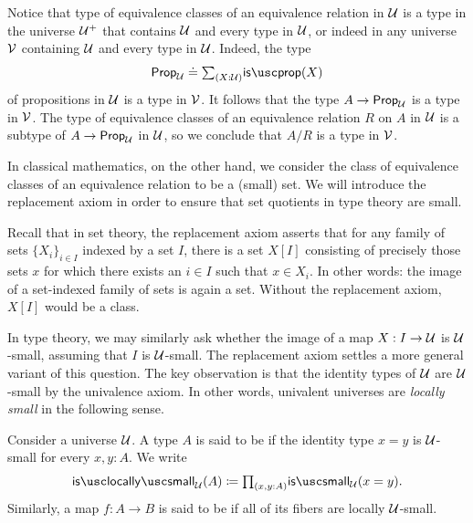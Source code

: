 \begin{rmk}
  Notice that type of equivalence classes of an equivalence relation in $\mathcal{U}$ is a type in the universe $\mathcal{U}^+$ that contains $\mathcal{U}$ and every type in $\mathcal{U}$, or indeed in any universe $\mathcal{V}$ containing $\mathcal{U}$ and every type in $\mathcal{U}$. Indeed, the type
  \begin{equation*}
    \prop_\UU\jdeq\sm{X:\UU}\isprop(X)
  \end{equation*}
  of propositions in $\mathcal{U}$ is a type in $\mathcal{V}$. It follows that the type $A\to\mathsf{Prop}_{\mathcal{U}}$ is a type in $\mathcal{V}$. The type of equivalence classes of an equivalence relation $R$ on $A$ in $\mathcal{U}$ is a subtype of $A\to\mathsf{Prop}_{\mathcal{U}}$ in $\mathcal{U}$, so we conclude that $A/R$ is a type in $\mathcal{V}$.
\end{rmk}

In classical mathematics, on the other hand, we consider the class of equivalence classes of an equivalence relation to be a (small) set. We will introduce the replacement axiom in order to ensure that set quotients in type theory are small.

Recall that in set theory, the replacement axiom asserts that for any family of sets $\{X_i\}_{i\in I}$ indexed by a set $I$, there is a set $X[I]$ consisting of precisely those sets $x$ for which there exists an $i\in I$ such that $x\in X_i$. In other words: the image of a set-indexed family of sets is again a set. Without the replacement axiom, $X[I]$ would be a class.

In type theory, we may similarly ask whether the image of a map $X:I\to\mathcal{U}$ is $\mathcal{U}$-small, assuming that $I$ is $\mathcal{U}$-small. The replacement axiom settles a more general variant of this question. The key observation is that the identity types of $\mathcal{U}$ are $\mathcal{U}$-small by the univalence axiom. In other words, univalent universes are \emph{locally small} in the following sense.

\begin{defn}\label{defn:locally-small-type}
  Consider a universe $\mathcal{U}$. A type $A$ is said to be  if the identity type $x=y$ is $\mathcal{U}$-small for every $x,y:A$.
    We write
    \begin{equation*}
      \islocallysmall_\UU(A)\defeq \prd{x,y:A}\issmall_\UU(x=y).
    \end{equation*}
    Similarly, a map $f:A\to B$ is said to be  if all of its fibers are locally $\mathcal{U}$-small.
\end{defn}

